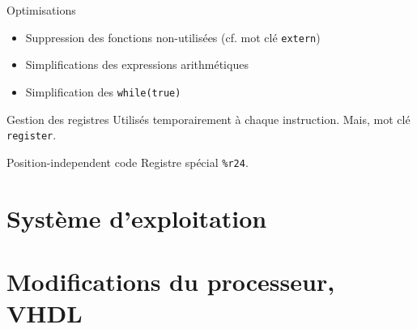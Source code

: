 \documentclass{beamer}
\begin{document}
  \begin{frame}[fragile]{Optimisations}
      \begin{itemize}
          \item Suppression des fonctions non-utilisées (cf. mot clé \verb+extern+)
          \item Simplifications des expressions arithmétiques
          \item Simplification des \verb+while(true)+
      \end{itemize}
\end{frame}

  \begin{frame}[fragile]{Gestion des registres}
      Utilisés temporairement à chaque instruction. Mais, mot clé \verb+register+.
\end{frame}

  \begin{frame}[fragile]{Position-independent code}
      Registre spécial \verb+%r24+.
\end{frame}

  \section{Système d'exploitation}

  \section{Modifications du processeur, VHDL}
\end{document}
